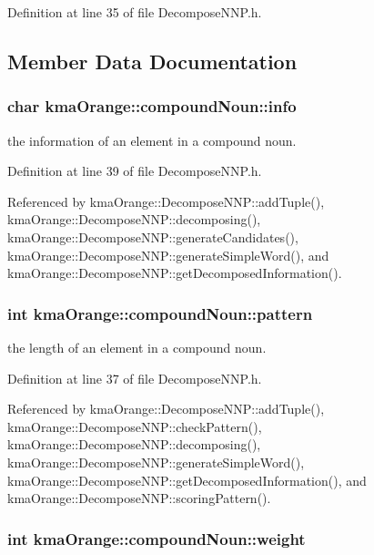 Definition at line 35 of file DecomposeNNP.h.

\subsection{Member Data Documentation}
\hypertarget{structkmaOrange_1_1compoundNoun_c9ebf6e5cad7f65007a726feec4aca49}{
\subsubsection[{info}]{\setlength{\rightskip}{0pt plus 5cm}char {\bf kmaOrange::compoundNoun::info}}}
\label{structkmaOrange_1_1compoundNoun_c9ebf6e5cad7f65007a726feec4aca49}


the information of an element in a compound noun. 



Definition at line 39 of file DecomposeNNP.h.

Referenced by kmaOrange::DecomposeNNP::addTuple(), kmaOrange::DecomposeNNP::decomposing(), kmaOrange::DecomposeNNP::generateCandidates(), kmaOrange::DecomposeNNP::generateSimpleWord(), and kmaOrange::DecomposeNNP::getDecomposedInformation().\hypertarget{structkmaOrange_1_1compoundNoun_b885769e0499b45eebb244c95981f100}{
\subsubsection[{pattern}]{\setlength{\rightskip}{0pt plus 5cm}int {\bf kmaOrange::compoundNoun::pattern}}}
\label{structkmaOrange_1_1compoundNoun_b885769e0499b45eebb244c95981f100}


the length of an element in a compound noun. 



Definition at line 37 of file DecomposeNNP.h.

Referenced by kmaOrange::DecomposeNNP::addTuple(), kmaOrange::DecomposeNNP::checkPattern(), kmaOrange::DecomposeNNP::decomposing(), kmaOrange::DecomposeNNP::generateSimpleWord(), kmaOrange::DecomposeNNP::getDecomposedInformation(), and kmaOrange::DecomposeNNP::scoringPattern().\hypertarget{structkmaOrange_1_1compoundNoun_d3c3b54777b32d9f99782414d77ab9c8}{
\subsubsection[{weight}]{\setlength{\rightskip}{0pt plus 5cm}int {\bf kmaOrange::compoundNoun::weight}}}
\label{structkmaOrange_1_1compoundNoun_d3c3b54777b32d9f99782414d77ab9c8}


